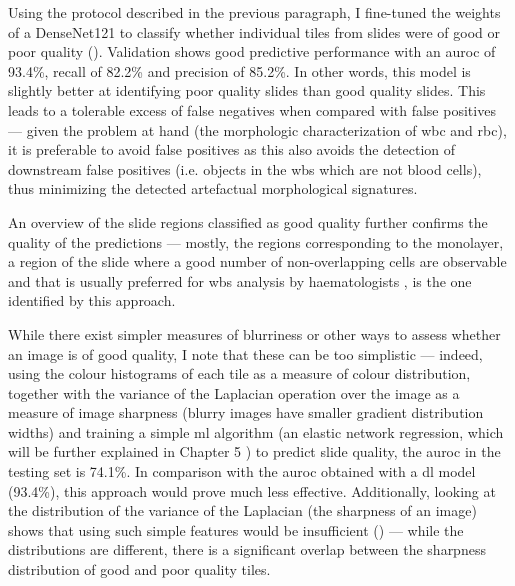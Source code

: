 Using the protocol described in the previous paragraph, I fine-tuned the weights of a DenseNet121 to classify whether individual tiles from slides were of good or poor quality (). Validation shows good predictive performance with an \ac{auroc} of 93.4\%, recall of 82.2\% and precision of 85.2\%. In other words, this model is slightly better at identifying poor quality slides than good quality slides. This leads to a tolerable excess of false negatives when compared with false positives --- given the problem at hand (the morphologic characterization of \ac{wbc} and \ac{rbc}), it is preferable to avoid false positives as this also avoids the detection of downstream false positives (i.e. objects in the \ac{wbs} which are not blood cells), thus minimizing the detected artefactual morphological signatures.

\begin{figure}[!ht]
    \label{fig:slide-quality-examples}
\end{figure}

An overview of the slide regions classified as good quality further confirms the quality of the predictions  --- mostly, the regions corresponding to the monolayer, a region of the slide where a good number of non-overlapping cells are observable and that is usually preferred for \ac{wbs} analysis by haematologists \cite{Adewoyin2014-vo}, is the one identified by this approach.

\begin{figure}[!ht]
    \label{fig:slide-quality-regions}
\end{figure}

While there exist simpler measures of blurriness or other ways to assess whether an image is of good quality, I note that these can be too simplistic --- indeed, using the colour histograms of each tile as a measure of colour distribution, together with the variance of the Laplacian operation over the image as a measure of image sharpness \cite{Bansal2016-xm} (blurry images have smaller gradient distribution widths) and training a simple \ac{ml} algorithm (an elastic network regression, which will be further explained in Chapter 5 \cite{Friedman2010-gl}) to predict slide quality, the \ac{auroc} in the testing set is 74.1\%. In comparison with the \ac{auroc} obtained with a \ac{dl} model (93.4\%), this approach would prove much less effective. Additionally, looking at the distribution of the variance of the Laplacian (the sharpness of an image) shows that using such simple features would be insufficient () --- while the distributions are different, there is a significant overlap between the sharpness distribution of good and poor quality tiles.

